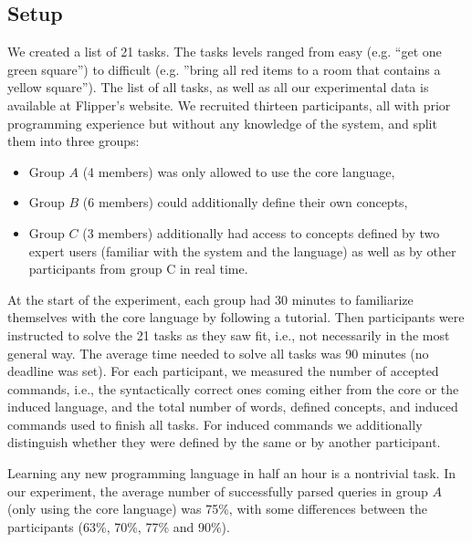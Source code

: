 \documentclass[letterpaper, 10 pt, conference]{ieeeconf}  %
\newcommand{\tool}{Flipper\xspace}
\begin{document}
\subsection{Setup}
We created a list of 21 tasks. The tasks levels ranged from easy (e.g.
``get one green square'') to difficult (e.g. ''bring all red items to a
room that contains a yellow square''). The list of all tasks, as well as
all our experimental data is available at \tool's website.
%
We recruited thirteen participants, all with prior programming experience but without any
knowledge of the system, and split them into three groups:
\begin{itemize}
	\item Group $A$ (4 members) was only allowed to use the core language,

	\item Group $B$ (6 members) could additionally define their own concepts,

	\item Group $C$ (3 members) additionally had access to concepts defined by two
		expert users (familiar with the system and the language) as well as by other
		participants from group C in real time.
\end{itemize}
%
At the start of the experiment, each group had 30 minutes to familiarize themselves with the core language by following a tutorial. 
Then participants were instructed to solve the 21 tasks as they saw fit, i.e., not necessarily in the most general way.
The average time needed to solve all tasks was 90 minutes (no deadline was set). 
For each participant, we measured the number of accepted commands, i.e., the syntactically 
correct ones coming either from the core or the induced language,
and the total number of words, defined concepts, and induced commands used to finish all tasks. 
For induced commands we additionally distinguish whether they were defined by the same or by another participant.


Learning any new programming language in half an hour is a nontrivial task. In
our experiment, the average number of successfully parsed queries in group $A$
(only using the core language) was 75\%, with some differences between
the participants (63\%, 70\%, 77\% and 90\%).
\end{document}
